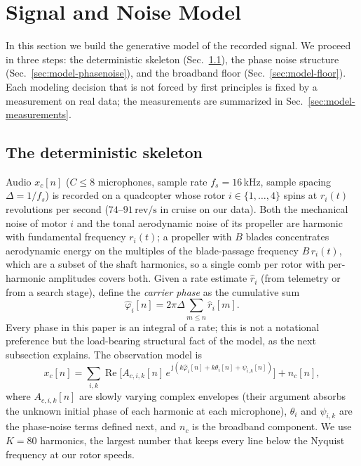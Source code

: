 \documentclass[journal]{IEEEtran}
\newcommand{\revps}{\ensuremath{\,\mathrm{rev/s}}}
\begin{document}
\section{Signal and Noise Model}
\label{sec:model}

In this section we build the generative model of the recorded signal.
We proceed in three steps: the deterministic skeleton
(Sec.~\ref{sec:model-skeleton}), the phase noise structure
(Sec.~\ref{sec:model-phasenoise}), and the broadband floor
(Sec.~\ref{sec:model-floor}). Each modeling decision that is not forced
by first principles is fixed by a measurement on real data; the
measurements are summarized in Sec.~\ref{sec:model-measurements}.

\subsection{The deterministic skeleton}
\label{sec:model-skeleton}

Audio $x_c[n]$ ($C \le 8$ microphones, sample rate $f_s = 16$\,kHz,
sample spacing $\Delta = 1/f_s$) is recorded on a quadcopter whose rotor
$i \in \{1,\dots,4\}$ spins at $r_i(t)$ revolutions per second
($74$--$91\revps$ in cruise on our data). Both the mechanical noise of
motor $i$ and the tonal aerodynamic noise of its propeller are harmonic
with fundamental frequency $r_i(t)$; a propeller with $B$ blades
concentrates aerodynamic energy on the multiples of the blade-passage
frequency $B\,r_i(t)$, which are a subset of the shaft harmonics, so a
single comb per rotor with per-harmonic amplitudes covers both. Given a
rate estimate $\hat r_i$ (from telemetry or from a search stage), define
the \emph{carrier phase} as the cumulative sum
\begin{equation}
  \hat\varphi_i[n] = 2\pi \Delta \sum_{m \le n} \hat r_i[m].
  \label{eq:carrier}
\end{equation}
Every phase in this paper is an integral of a rate; this is not a
notational preference but the load-bearing structural fact of the model,
as the next subsection explains. The observation model is
\begin{equation}
  x_c[n] = \sum_{i,k}
  \operatorname{Re}\Big[ A_{c,i,k}[n]\,
    e^{\,\mathrm{j} ( k \hat\varphi_i[n] + k\theta_i[n] +
      \psi_{i,k}[n] )} \Big] + n_c[n],
  \label{eq:model}
\end{equation}
where $A_{c,i,k}[n]$ are slowly varying complex envelopes (their
argument absorbs the unknown initial phase of each harmonic at each
microphone), $\theta_i$ and $\psi_{i,k}$ are the phase-noise terms
defined next, and $n_c$ is the broadband component. We use $K = 80$
harmonics, the largest number that keeps every line below the Nyquist
frequency at our rotor speeds.
\end{document}
